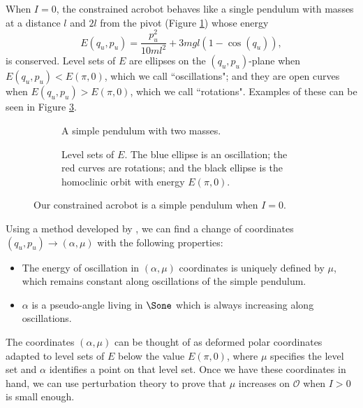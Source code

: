 When \(I = 0\), the constrained acrobot behaves like a single
pendulum with masses at a distance \(l\) and \(2l\) from the pivot 
(Figure \ref{fig:acrobot-I0}) whose energy
\begin{equation}\label{eqn:acrobot-nominal-E}
    E(q_u,p_u) = \frac{p_u^2}{10ml^2} + 3mgl(1 - \cos(q_u))
    ,
\end{equation}
is conserved.
Level sets of \(E\) are ellipses on the \((q_u,p_u)\)-plane
when \(E(q_u,p_u) < E(\pi,0)\), which we call ``oscillations";
and they are open curves when \(E(q_u,p_u) > E(\pi,0)\), which we call
``rotations". 
Examples of these can be seen in Figure \ref{fig:pendulum-level-sets}.

\begin{figure}
    \centering
    \begin{subfigure}[t]{0.45\textwidth}
        
        \caption{A simple pendulum with two masses.}
        \label{fig:acrobot-I0}
    \end{subfigure}
    \hfill
    \begin{subfigure}[t]{0.5\textwidth}
        
        \caption{Level sets of \(E\).
            The blue ellipse is an oscillation; the red curves
            are rotations; and the black ellipse is the homoclinic
            orbit with energy \(E(\pi,0)\).}
        \label{fig:pendulum-level-sets}
    \end{subfigure}
    \caption{Our constrained acrobot is a simple pendulum when \(I = 0\).}
\end{figure}

Using a method developed by \citet{dynamic_vhcs_stabilize_closed_orbits},
we can find a change of coordinates \((q_u,p_u) \to (\alpha, \mu)\) with the
following properties:
\begin{itemize}
    \item The energy of oscillation in \((\alpha,\mu)\) coordinates is 
        uniquely defined by \(\mu\), which remains constant along oscillations
        of the simple pendulum.
    \item \(\alpha\) is a pseudo-angle living in \(\Sone\) which is
        always increasing along oscillations.
\end{itemize}
The coordinates \((\alpha,\mu)\) can be thought of as deformed polar coordinates
adapted to level sets of \(E\) below the value \(E(\pi,0)\), 
where \(\mu\) specifies the level set and \(\alpha\) identifies a point on that
level set.
Once we have these coordinates in hand, we can use perturbation theory to prove
that \(\mu\) increases on \(\mathcal{O}\) when \(I > 0\) is small enough.


